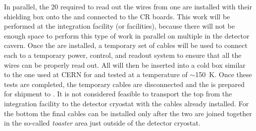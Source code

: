 In parallel, the \num{20} %
 required to read out the
wires from one  are installed with their shielding box onto the  and
connected to the CR boards. This work will be performed at the integration
facility (or facilities), because there will not be enough space to perform
this type of work in parallel on multiple  in the detector cavern. Once
the  are installed, a temporary set of cables will be
used to connect each  to a temporary power, control, and readout system
to ensure that all the wires can be properly read out. All 
will then be inserted into a cold box similar
to the one used at CERN for  and tested at a temperature of
$\sim$\SI{150}{K}. Once these tests
are completed, the temporary cables are disconnected and the  is prepared
for shipment to \surf. It is not considered feasible to transport the
top  from the integration facility to the detector cryostat with the
 cables already installed. For the bottom  the final cables can be
installed only after the two  are joined together in the so-called \textit{toaster} area
just outside of the detector cryostat.

